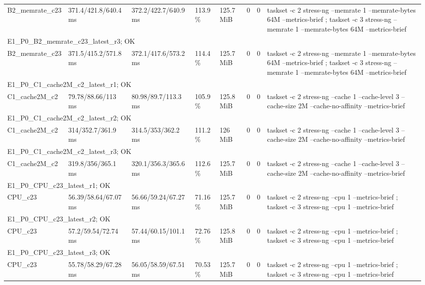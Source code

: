 \begin{tabular}{llllllll}
B2\_memrate\_c23 & 371.4/421.8/640.4 ms & 372.2/422.7/640.9 ms & 113.9 \% & 125.7 MiB & 0 & 0 & taskset -c 2 stress-ng --memrate 1 --memrate-bytes 64M --metrics-brief ; taskset -c 3 stress-ng --memrate 1 --memrate-bytes 64M --metrics-brief \\
\multicolumn{8}{l}{E1\_P0\_B2\_memrate\_c23\_latest\_r3; OK} \\
B2\_memrate\_c23 & 371.5/415.2/571.8 ms & 372.1/417.6/573.2 ms & 114.4 \% & 125.7 MiB & 0 & 0 & taskset -c 2 stress-ng --memrate 1 --memrate-bytes 64M --metrics-brief ; taskset -c 3 stress-ng --memrate 1 --memrate-bytes 64M --metrics-brief \\
\multicolumn{8}{l}{E1\_P0\_C1\_cache2M\_c2\_latest\_r1; OK} \\
C1\_cache2M\_c2 & 79.78/88.66/113 ms & 80.98/89.7/113.3 ms & 105.9 \% & 125.8 MiB & 0 & 0 & taskset -c 2 stress-ng --cache 1 --cache-level 3 --cache-size 2M --cache-no-affinity --metrics-brief \\
\multicolumn{8}{l}{E1\_P0\_C1\_cache2M\_c2\_latest\_r2; OK} \\
C1\_cache2M\_c2 & 314/352.7/361.9 ms & 314.5/353/362.2 ms & 111.2 \% & 126 MiB & 0 & 0 & taskset -c 2 stress-ng --cache 1 --cache-level 3 --cache-size 2M --cache-no-affinity --metrics-brief \\
\multicolumn{8}{l}{E1\_P0\_C1\_cache2M\_c2\_latest\_r3; OK} \\
C1\_cache2M\_c2 & 319.8/356/365.1 ms & 320.1/356.3/365.6 ms & 112.6 \% & 125.7 MiB & 0 & 0 & taskset -c 2 stress-ng --cache 1 --cache-level 3 --cache-size 2M --cache-no-affinity --metrics-brief \\
\multicolumn{8}{l}{E1\_P0\_CPU\_c23\_latest\_r1; OK} \\
CPU\_c23 & 56.39/58.64/67.07 ms & 56.66/59.24/67.27 ms & 71.16 \% & 125.7 MiB & 0 & 0 & taskset -c 2 stress-ng --cpu 1 --metrics-brief ; taskset -c 3 stress-ng --cpu 1 --metrics-brief \\
\multicolumn{8}{l}{E1\_P0\_CPU\_c23\_latest\_r2; OK} \\
CPU\_c23 & 57.2/59.54/72.74 ms & 57.44/60.15/101.1 ms & 72.76 \% & 125.8 MiB & 0 & 0 & taskset -c 2 stress-ng --cpu 1 --metrics-brief ; taskset -c 3 stress-ng --cpu 1 --metrics-brief \\
\multicolumn{8}{l}{E1\_P0\_CPU\_c23\_latest\_r3; OK} \\
CPU\_c23 & 55.78/58.29/67.28 ms & 56.05/58.59/67.51 ms & 70.53 \% & 125.7 MiB & 0 & 0 & taskset -c 2 stress-ng --cpu 1 --metrics-brief ; taskset -c 3 stress-ng --cpu 1 --metrics-brief \\
\bottomrule
\end{tabular}
